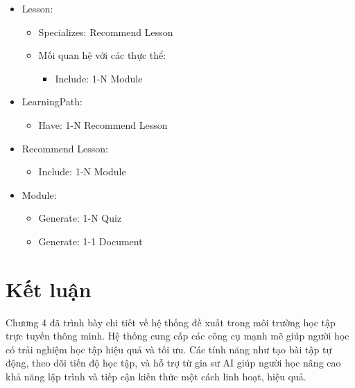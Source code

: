\begin{itemize}
    \item Lesson:
    \begin{itemize}
        \item Specializes: Recommend Lesson
        \item Mối quan hệ với các thực thể:
        \begin{itemize}
            \item Include: 1-N Module
        \end{itemize}
    \end{itemize}

    \item LearningPath:
    \begin{itemize}
        \item Have: 1-N Recommend Lesson
    \end{itemize}

    \item Recommend Lesson:
    \begin{itemize}
        \item Include: 1-N Module
    \end{itemize}

    \item Module:
    \begin{itemize}
        \item Generate: 1-N Quiz
        \item Generate: 1-1 Document
    \end{itemize}
\end{itemize}
\section{Kết luận}
Chương 4 đã trình bày chi tiết về hệ thống đề xuất trong môi trường học tập trực tuyến thông minh. Hệ thống cung cấp các công cụ mạnh mẽ giúp người học có trải nghiệm học tập hiệu quả và tối ưu. Các tính năng như tạo bài tập tự động, theo dõi tiến độ học tập, và hỗ trợ từ gia sư AI giúp người học nâng cao khả năng lập trình và tiếp cận kiến thức một cách linh hoạt, hiệu quả.